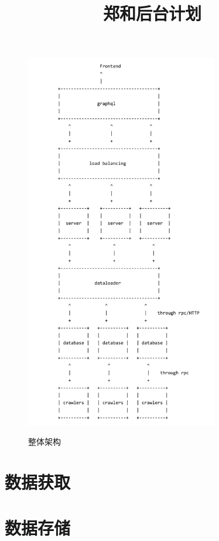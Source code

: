 \documentclass[UTF8]{ctexrep}
\title{郑和后台计划}
\begin{document}
\maketitle
\newpage


\begin{figure}[h]
    \caption{整体架构}
    \centering
    \includegraphics[width=0.75\textwidth]{assets/figures/arch2.png}
    \label{fig:arch}
\end{figure}
\part{数据获取}


\part{数据存储}
\end{document}

